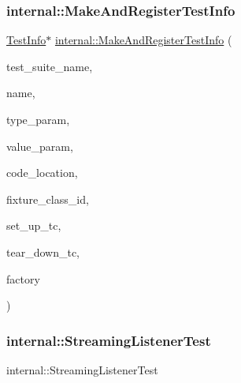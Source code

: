 \subsubsection{\texorpdfstring{internal::MakeAndRegisterTestInfo}{internal::MakeAndRegisterTestInfo}\hspace{0.1cm}{\footnotesize\ttfamily [3/3]}}
{\footnotesize\ttfamily \mbox{\hyperlink{classtesting_1_1_test_info}{Test\+Info}}$\ast$ \mbox{\hyperlink{namespacetesting_1_1internal_a82087d14f1d2e6b1930237a644658d3a}{internal\+::\+Make\+And\+Register\+Test\+Info}} (\begin{DoxyParamCaption}\item[{const char $\ast$}]{test\+\_\+suite\+\_\+name,  }\item[{const char $\ast$}]{name,  }\item[{const char $\ast$}]{type\+\_\+param,  }\item[{const char $\ast$}]{value\+\_\+param,  }\item[{\mbox{\hyperlink{structtesting_1_1internal_1_1_code_location}{internal\+::\+Code\+Location}}}]{code\+\_\+location,  }\item[{\mbox{\hyperlink{namespacetesting_1_1internal_a38c435cbab5f8b784e2e7f3356cab242}{internal\+::\+Type\+Id}}}]{fixture\+\_\+class\+\_\+id,  }\item[{\mbox{\hyperlink{namespacetesting_1_1internal_a028e9455ad22171feabf84fe46329c92}{internal\+::\+Set\+Up\+Test\+Suite\+Func}}}]{set\+\_\+up\+\_\+tc,  }\item[{\mbox{\hyperlink{namespacetesting_1_1internal_ab58aba5acd47d329b72a1d10c7b61648}{internal\+::\+Tear\+Down\+Test\+Suite\+Func}}}]{tear\+\_\+down\+\_\+tc,  }\item[{\mbox{\hyperlink{classtesting_1_1internal_1_1_test_factory_base}{internal\+::\+Test\+Factory\+Base}} $\ast$}]{factory }\end{DoxyParamCaption})\hspace{0.3cm}{\ttfamily [friend]}}

\mbox{\label{classtesting_1_1_test_info_a2021083660b7387a257fb6c6242fee73}} 
\subsubsection{\texorpdfstring{internal::StreamingListenerTest}{internal::StreamingListenerTest}}
{\footnotesize\ttfamily internal\+::\+Streaming\+Listener\+Test\hspace{0.3cm}{\ttfamily [friend]}}

